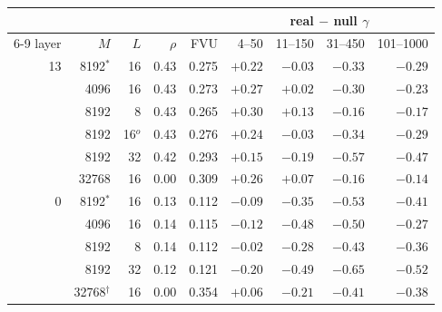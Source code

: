 \begin{tabular}{r r r r r rrrr}
\toprule
 & & & & & \multicolumn{4}{c}{real $-$ null $\gamma$} \\
\cmidrule(lr){6-9}
layer & $M$ & $L$ & $\rho$ & FVU & 4--50 & 11--150 & 31--450 & 101--1000 \\
\midrule
13 & 8192$^{*}$ & 16 & 0.43 & 0.275 & $+0.22$ & $-0.03$ & $-0.33$ & $-0.29$ \\
 & 4096 & 16 & 0.43 & 0.273 & $+0.27$ & $+0.02$ & $-0.30$ & $-0.23$ \\
 & 8192 & 8 & 0.43 & 0.265 & $+0.30$ & $+0.13$ & $-0.16$ & $-0.17$ \\
 & 8192 & 16$^{o}$ & 0.43 & 0.276 & $+0.24$ & $-0.03$ & $-0.34$ & $-0.29$ \\
 & 8192 & 32 & 0.42 & 0.293 & $+0.15$ & $-0.19$ & $-0.57$ & $-0.47$ \\
 & 32768 & 16 & 0.00 & 0.309 & $+0.26$ & $+0.07$ & $-0.16$ & $-0.14$ \\
\midrule
0 & 8192$^{*}$ & 16 & 0.13 & 0.112 & $-0.09$ & $-0.35$ & $-0.53$ & $-0.41$ \\
 & 4096 & 16 & 0.14 & 0.115 & $-0.12$ & $-0.48$ & $-0.50$ & $-0.27$ \\
 & 8192 & 8 & 0.14 & 0.112 & $-0.02$ & $-0.28$ & $-0.43$ & $-0.36$ \\
 & 8192 & 32 & 0.12 & 0.121 & $-0.20$ & $-0.49$ & $-0.65$ & $-0.52$ \\
 & 32768$^\dagger$ & 16 & 0.00 & 0.354 & $+0.06$ & $-0.21$ & $-0.41$ & $-0.38$ \\
\bottomrule
\end{tabular}
